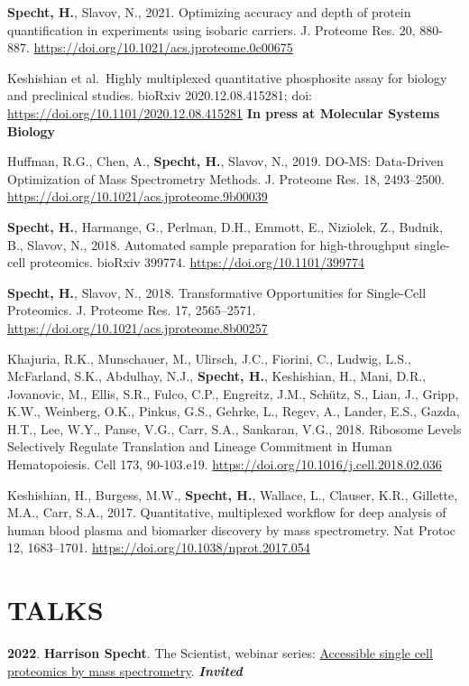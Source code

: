 \documentclass[11pt,]{article}
\begin{document}
\textbf{Specht, H.}, Slavov, N., 2021. Optimizing accuracy and depth of
protein quantification in experiments using isobaric carriers. J.
Proteome Res. 20, 880-887.
\url{https://doi.org/10.1021/acs.jproteome.0c00675}

Keshishian et al.~Highly multiplexed quantitative phosphosite assay for
biology and preclinical studies. bioRxiv 2020.12.08.415281; doi:
\url{https://doi.org/10.1101/2020.12.08.415281} \textbf{In press at
Molecular Systems Biology}

Huffman, R.G., Chen, A., \textbf{Specht, H.}, Slavov, N., 2019. DO-MS:
Data-Driven Optimization of Mass Spectrometry Methods. J. Proteome Res.
18, 2493--2500. \url{https://doi.org/10.1021/acs.jproteome.9b00039}

\textbf{Specht, H.}, Harmange, G., Perlman, D.H., Emmott, E., Niziolek,
Z., Budnik, B., Slavov, N., 2018. Automated sample preparation for
high-throughput single-cell proteomics. bioRxiv 399774.
\url{https://doi.org/10.1101/399774}

\textbf{Specht, H.}, Slavov, N., 2018. Transformative Opportunities for
Single-Cell Proteomics. J. Proteome Res. 17, 2565--2571.
\url{https://doi.org/10.1021/acs.jproteome.8b00257}

Khajuria, R.K., Munschauer, M., Ulirsch, J.C., Fiorini, C., Ludwig,
L.S., McFarland, S.K., Abdulhay, N.J., \textbf{Specht, H.}, Keshishian,
H., Mani, D.R., Jovanovic, M., Ellis, S.R., Fulco, C.P., Engreitz, J.M.,
Schütz, S., Lian, J., Gripp, K.W., Weinberg, O.K., Pinkus, G.S., Gehrke,
L., Regev, A., Lander, E.S., Gazda, H.T., Lee, W.Y., Panse, V.G., Carr,
S.A., Sankaran, V.G., 2018. Ribosome Levels Selectively Regulate
Translation and Lineage Commitment in Human Hematopoiesis. Cell 173,
90-103.e19. \url{https://doi.org/10.1016/j.cell.2018.02.036}

Keshishian, H., Burgess, M.W., \textbf{Specht, H.}, Wallace, L.,
Clauser, K.R., Gillette, M.A., Carr, S.A., 2017. Quantitative,
multiplexed workflow for deep analysis of human blood plasma and
biomarker discovery by mass spectrometry. Nat Protoc 12, 1683--1701.
\url{https://doi.org/10.1038/nprot.2017.054}

\hypertarget{talks}{%
\section{TALKS}\label{talks}}

\textbf{2022}. \textbf{Harrison Specht}. The Scientist, webinar series:
\href{https://www.the-scientist.com/sponsored-webinars/using-single-cell-proteomics-to-understand-human-health-and-disease-69977}{Accessible
single cell proteomics by mass spectrometry}. \emph{\textbf{Invited}}
\end{document}
